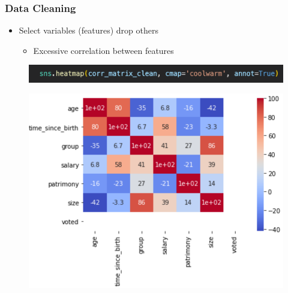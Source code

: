 \begin{frame}\frametitle{Data Cleaning}
   \begin{itemize}
      \item Select variables (features) drop others
      \begin{itemize}
         \item Excessive correlation between features
      \end{itemize}
   \end{itemize}
   \vspace{.5cm}
   \begin{figure}[H]
      \includegraphics[scale=.35]{../images/illustrations/data_cleaning_corr_heatmap_code.png}
   \end{figure}
   \begin{figure}[H]
      \includegraphics[scale=.35]{../images/illustrations/data_cleaning_corr_heatmap_graph.png}
   \end{figure}
\end{frame}




